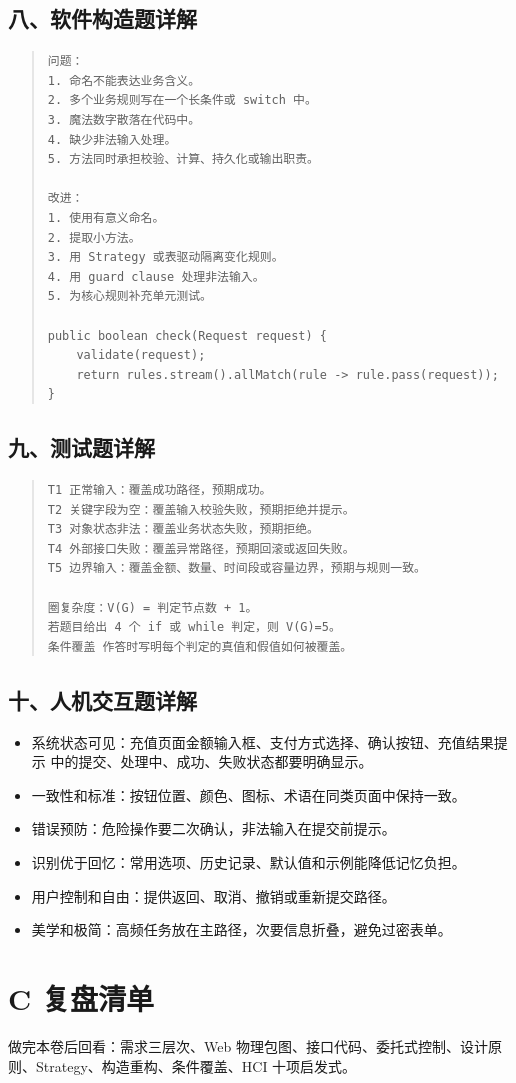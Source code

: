 \documentclass[UTF8,zihao=-4]{ctexart}
\begin{document}
\subsection{八、软件构造题详解}


\begin{quote}
\footnotesize
\begin{verbatim}
问题：
1. 命名不能表达业务含义。
2. 多个业务规则写在一个长条件或 switch 中。
3. 魔法数字散落在代码中。
4. 缺少非法输入处理。
5. 方法同时承担校验、计算、持久化或输出职责。

改进：
1. 使用有意义命名。
2. 提取小方法。
3. 用 Strategy 或表驱动隔离变化规则。
4. 用 guard clause 处理非法输入。
5. 为核心规则补充单元测试。

public boolean check(Request request) {
    validate(request);
    return rules.stream().allMatch(rule -> rule.pass(request));
}
\end{verbatim}
\end{quote}



\subsection{九、测试题详解}


\begin{quote}
\footnotesize
\begin{verbatim}
T1 正常输入：覆盖成功路径，预期成功。
T2 关键字段为空：覆盖输入校验失败，预期拒绝并提示。
T3 对象状态非法：覆盖业务状态失败，预期拒绝。
T4 外部接口失败：覆盖异常路径，预期回滚或返回失败。
T5 边界输入：覆盖金额、数量、时间段或容量边界，预期与规则一致。

圈复杂度：V(G) = 判定节点数 + 1。
若题目给出 4 个 if 或 while 判定，则 V(G)=5。
条件覆盖 作答时写明每个判定的真值和假值如何被覆盖。
\end{verbatim}
\end{quote}



\subsection{十、人机交互题详解}


\begin{itemize}
\item 系统状态可见：充值页面金额输入框、支付方式选择、确认按钮、充值结果提示 中的提交、处理中、成功、失败状态都要明确显示。
\item 一致性和标准：按钮位置、颜色、图标、术语在同类页面中保持一致。
\item 错误预防：危险操作要二次确认，非法输入在提交前提示。
\item 识别优于回忆：常用选项、历史记录、默认值和示例能降低记忆负担。
\item 用户控制和自由：提供返回、取消、撤销或重新提交路径。
\item 美学和极简：高频任务放在主路径，次要信息折叠，避免过密表单。
\end{itemize}



\section{C 复盘清单}


做完本卷后回看：需求三层次、Web 物理包图、接口代码、委托式控制、设计原则、Strategy、构造重构、条件覆盖、HCI 十项启发式。
\end{document}
